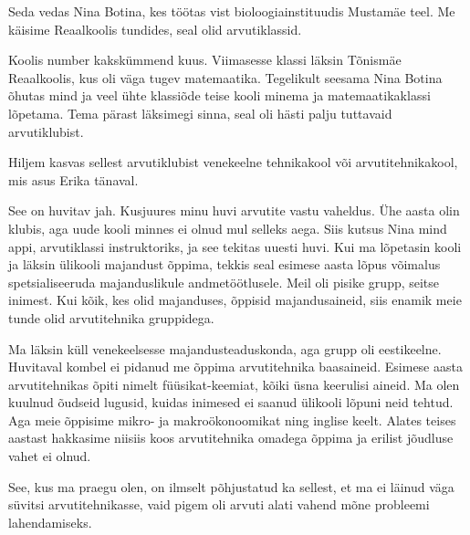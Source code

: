 
Seda vedas Nina Botina, kes töötas vist bioloogiainstituudis Mustamäe teel. Me käisime 
Reaalkoolis tundides,
seal olid arvutiklassid.


Koolis number kakskümmend kuus. 
Viimasesse klassi läksin Tõnismäe Reaalkoolis, 
kus oli väga tugev matemaatika. Tegelikult seesama Nina Botina õhutas mind ja 
veel ühte klassiõde teise kooli minema ja 
matemaatikaklassi lõpetama. Tema pärast läksimegi sinna, seal oli hästi palju  
tuttavaid arvutiklubist.

Hiljem kasvas sellest arvutiklubist venekeelne tehnikakool või
arvutitehnikakool, mis asus Erika tänaval. 


See on huvitav jah. Kusjuures minu huvi arvutite vastu 
vaheldus. Ühe aasta olin klubis, aga uude kooli minnes ei olnud mul 
selleks aega. Siis kutsus Nina mind appi, arvutiklassi instruktoriks, ja see 
tekitas uuesti huvi. Kui ma lõpetasin kooli ja läksin
ülikooli majandust õppima, tekkis seal esimese aasta lõpus 
võimalus spetsialiseeruda majanduslikule andmetöötlusele. Meil oli pisike 
grupp, seitse inimest. Kui kõik, kes olid majanduses, õppisid majandusaineid, siis enamik meie tunde olid arvutitehnika gruppidega.

Ma läksin küll venekeelsesse majandusteaduskonda, 
aga grupp oli eestikeelne. Huvitaval kombel ei pidanud me õppima arvutitehnika baasaineid. 
Esimese aasta arvutitehnikas õpiti nimelt füüsikat-keemiat, kõiki üsna 
keerulisi aineid. Ma olen kuulnud õudseid lugusid, kuidas inimesed ei saanud ülikooli 
lõpuni neid tehtud. Aga meie õppisime mikro- ja makroökonoomikat ning 
inglise keelt. Alates teises aastast hakkasime niisiis koos arvutitehnika omadega õppima ja
erilist jõudluse vahet ei olnud.

See, kus ma praegu olen, on ilmselt  
põhjustatud ka sellest, et ma ei läinud väga süvitsi arvutitehnikasse, vaid pigem 
oli arvuti alati vahend mõne probleemi lahendamiseks.



